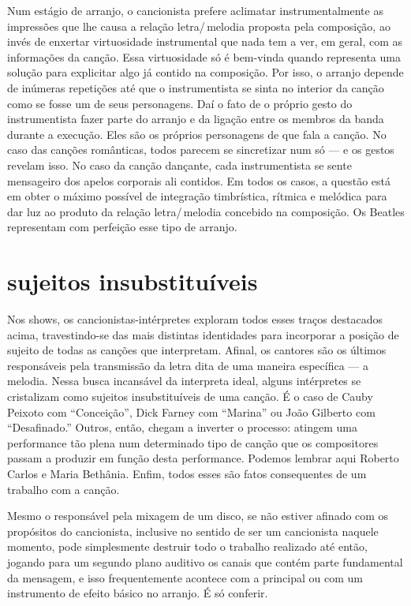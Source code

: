 Num estágio de arranjo, o cancionista prefere aclimatar
instrumentalmente as impressões que lhe causa a relação letra/\,melodia
proposta pela composição, ao invés de enxertar virtuosidade
instrumental que nada tem a ver, em geral, com as informações da canção.
Essa virtuosidade só é bem-vinda quando representa uma solução para
explicitar algo já contido na composição. Por isso, o arranjo depende de
inúmeras repetições até que o instrumentista se sinta no interior da
canção como se fosse um de seus personagens. Daí o fato de o próprio
gesto do instrumentista fazer parte do arranjo e da ligação entre os
membros da banda durante a execução. Eles são os próprios personagens de
que fala a canção. No caso das canções românticas, todos parecem se
sincretizar num só --- e os gestos revelam isso. No caso da canção
dançante, cada instrumentista se sente mensageiro dos apelos corporais
ali contidos. Em todos os casos, a questão está em obter o máximo
possível de integração timbrística, rítmica e melódica para dar luz ao
produto da relação letra/\,melodia concebido na composição. Os Beatles
representam com perfeição esse tipo de arranjo.

\section{sujeitos insubstituíveis}

Nos shows, os cancionistas-intérpretes exploram todos esses traços
destacados acima, travestindo-se das mais distintas identidades para
incorporar a posição de sujeito de todas as canções que interpretam.
Afinal, os cantores são os últimos responsáveis pela transmissão da
letra dita de uma maneira específica --- a melodia. Nessa
busca incansável da interpreta ideal, alguns intérpretes se cristalizam
como sujeitos insubstituíveis de uma canção. É o caso de Cauby Peixoto
com ``Conceição'', Dick Farney com ``Marina'' ou João Gilberto com
``Desafinado.'' Outros, então, chegam a inverter o processo: atingem
uma performance tão plena num determinado tipo de canção que os compositores
passam a produzir em função desta performance. Podemos lembrar aqui
Roberto Carlos e Maria Bethânia. Enfim, todos esses são fatos
consequentes de um trabalho com a canção.

Mesmo o responsável pela mixagem de um disco, se não estiver afinado com
os propósitos do cancionista, inclusive no sentido de ser um cancionista
naquele momento, pode simplesmente destruir todo o trabalho realizado
até então, jogando para um segundo plano auditivo os canais que contém
parte fundamental da mensagem, e isso frequentemente acontece com a
principal ou com um instrumento de efeito básico no arranjo. É só
conferir.

